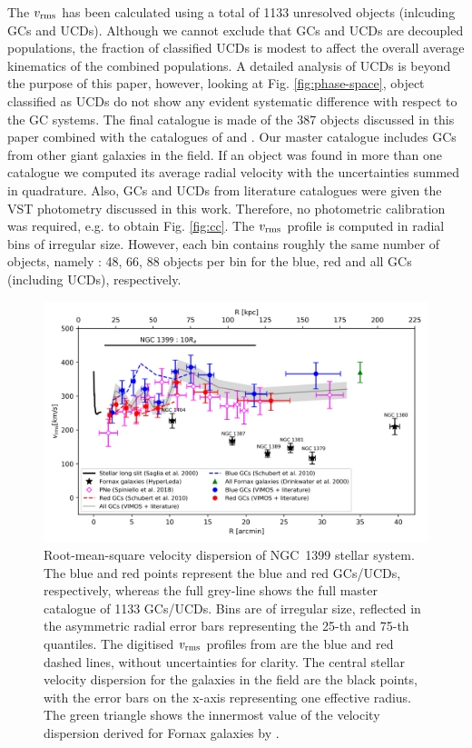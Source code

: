 \documentclass[useAMS,usenatbib]{mn2e}
\begin{document}
The $v_{\rm rms}$ has been calculated using a total of 1133 unresolved objects 
(inlcuding GCs and UCDs). Although we cannot exclude that GCs and UCDs are 
decoupled populations, 
the fraction of classified UCDs is modest to affect the overall average 
kinematics of the combined populations. A detailed analysis of UCDs is beyond 
the purpose of this paper,
however, looking at Fig. \ref{fig:phase-space}, object classified as UCDs do 
not show any evident systematic difference with respect to the GC systems. 
The final catalogue is made of the 387 objects discussed in this paper 
combined with the catalogues of \citet{Bergond07} and \citet{Schuberth}. Our master catalogue
includes GCs from other giant galaxies in the field. If an 
object was found in more than one catalogue we computed its average radial 
velocity with the uncertainties summed in quadrature. Also, GCs and UCDs from 
literature catalogues were given the VST photometry discussed in this work. 
Therefore, no photometric calibration was required, e.g. to obtain Fig. 
\ref{fig:cc}. The $v_{\rm rms}$ profile is computed in radial bins of irregular 
size. However, each bin contains roughly the same number of objects, namely : 
48, 66, 88 objects per bin for the blue, red and all GCs (including UCDs), respectively. 

\begin{figure}
\centering
\includegraphics[scale = 0.8]{figures/vrms_pne.png} 
\caption{Root-mean-square velocity dispersion of NGC~1399 stellar system. The 
blue and red points represent the blue and red GCs/UCDs, respectively, whereas 
the full grey-line shows the full master catalogue of 1133 GCs/UCDs. Bins are 
of irregular size, reflected in the asymmetric radial error bars representing 
the 25-th and 75-th quantiles. The digitised $v_{\rm rms}$ profiles from 
\citet{Schuberth} are the blue and red dashed lines, without uncertainties for 
clarity. The central stellar velocity dispersion for the galaxies in the field 
are the black points, with the error bars on the x-axis representing one 
effective radius. The green triangle shows the innermost value of the velocity 
dispersion derived for Fornax galaxies by \citet{Drinkwater00}.}
\label{fig:vrms}
\end{figure}
\end{document}

